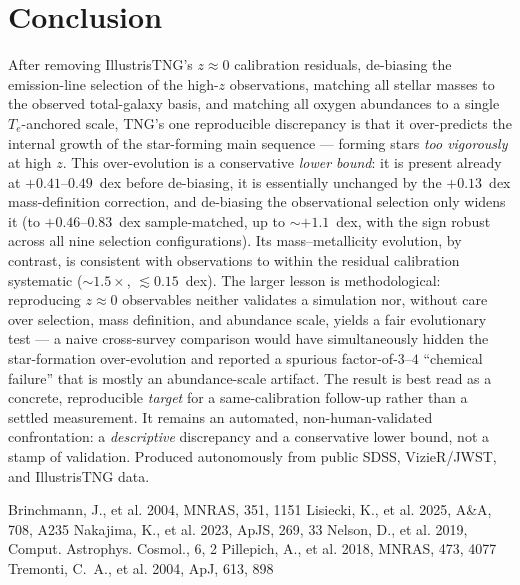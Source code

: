 \documentclass[twocolumn]{aastex631}
\begin{document}
\section{Conclusion}
After removing IllustrisTNG's $z\approx0$ calibration residuals, de-biasing the emission-line selection of the high-$z$ observations, matching all stellar masses to the observed total-galaxy basis, and matching all oxygen abundances to a single $T_e$-anchored scale, TNG's one reproducible discrepancy is that it over-predicts the internal growth of the star-forming main sequence --- forming stars \emph{too vigorously} at high $z$. This over-evolution is a conservative \emph{lower bound}: it is present already at $+0.41$--$0.49$~dex before de-biasing, it is essentially unchanged by the $+0.13$~dex mass-definition correction, and de-biasing the observational selection only widens it (to $+0.46$--$0.83$~dex sample-matched, up to $\sim+1.1$~dex, with the sign robust across all nine selection configurations). Its mass--metallicity evolution, by contrast, is consistent with observations to within the residual calibration systematic ($\sim1.5\times$, $\lesssim0.15$~dex). The larger lesson is methodological: reproducing $z\approx0$ observables neither validates a simulation nor, without care over selection, mass definition, and abundance scale, yields a fair evolutionary test --- a naive cross-survey comparison would have simultaneously hidden the star-formation over-evolution and reported a spurious factor-of-$3$--$4$ ``chemical failure'' that is mostly an abundance-scale artifact. The result is best read as a concrete, reproducible \emph{target} for a same-calibration follow-up rather than a settled measurement. It remains an automated, non-human-validated confrontation: a \emph{descriptive} discrepancy and a conservative lower bound, not a stamp of validation. Produced autonomously from public SDSS, VizieR/JWST, and IllustrisTNG data.

\begin{thebibliography}{}
 Brinchmann, J., et al. 2004, MNRAS, 351, 1151
 Lisiecki, K., et al. 2025, A\&A, 708, A235
 Nakajima, K., et al. 2023, ApJS, 269, 33
 Nelson, D., et al. 2019, Comput. Astrophys. Cosmol., 6, 2
 Pillepich, A., et al. 2018, MNRAS, 473, 4077
 Tremonti, C.~A., et al. 2004, ApJ, 613, 898
\end{thebibliography}
\end{document}

